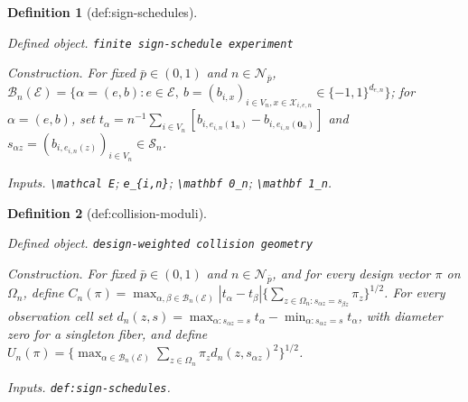 \documentclass{article}
\newtheorem{definition}{Definition}
\begin{document}
\begin{definition}[def:sign-schedules]\label{def:sign-schedules}
\par\smallskip\noindent\emph{Defined object.} \texttt{finite sign-\allowbreak{}schedule experiment}
\par\smallskip\noindent\emph{Construction.} For fixed \(\bar p\in(0,1)\) and \(n\in\mathcal N_{\bar p}\), \(\mathcal B_n(\mathcal E)=\{\alpha=(e,b):e\in\mathcal E,\ b=(b_{i,x})_{i\in V_n,x\in\mathcal X_{i,e,n}}\in\{-1,1\}^{d_{e,n}}\}\); for \(\alpha=(e,b)\), set \(t_\alpha=n^{-1}\sum_{i\in V_n}[b_{i,e_{i,n}(\mathbf 1_n)}-b_{i,e_{i,n}(\mathbf 0_n)}]\) and \(s_{\alpha z}=(b_{i,e_{i,n}(z)})_{i\in V_n}\in\mathcal S_n\).
\par\smallskip\noindent\emph{Inputs.} \texttt{\textbackslash{}\allowbreak{}mathcal E}; \texttt{e\_\allowbreak{}\{i,\allowbreak{}n\}\allowbreak{}}; \texttt{\textbackslash{}\allowbreak{}mathbf 0\_\allowbreak{}n}; \texttt{\textbackslash{}\allowbreak{}mathbf 1\_\allowbreak{}n}.
\end{definition}

\begin{definition}[def:collision-moduli]\label{def:collision-moduli}
\par\smallskip\noindent\emph{Defined object.} \texttt{design-\allowbreak{}weighted collision geometry}
\par\smallskip\noindent\emph{Construction.} For fixed \(\bar p\in(0,1)\) and \(n\in\mathcal N_{\bar p}\), and for every design vector \(\pi\) on \(\Omega_n\), define \(C_n(\pi)=\max_{\alpha,\beta\in\mathcal B_n(\mathcal E)}|t_\alpha-t_\beta|\{\sum_{z\in\Omega_n:s_{\alpha z}=s_{\beta z}}\pi_z\}^{1/2}\). For every observation cell set \(d_n(z,s)=\max_{\alpha:s_{\alpha z}=s}t_\alpha-\min_{\alpha:s_{\alpha z}=s}t_\alpha\), with diameter zero for a singleton fiber, and define \(U_n(\pi)=\{\max_{\alpha\in\mathcal B_n(\mathcal E)}\sum_{z\in\Omega_n}\pi_z d_n(z,s_{\alpha z})^2\}^{1/2}\).
\par\smallskip\noindent\emph{Inputs.} \texttt{def:\allowbreak{}sign-\allowbreak{}schedules}.
\end{definition}
\end{document}
